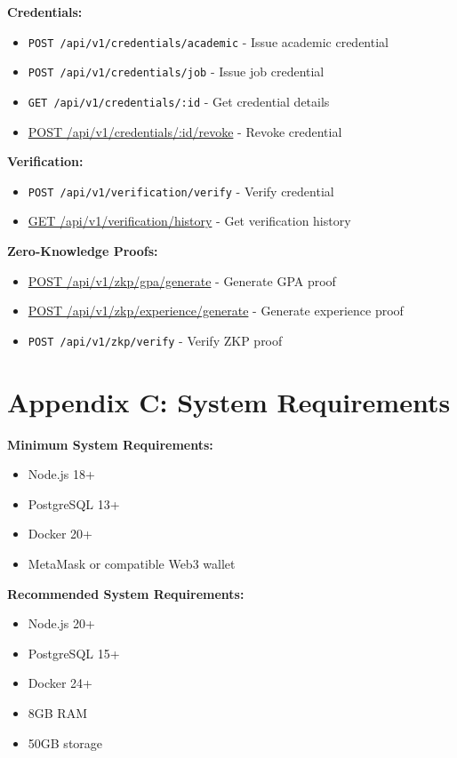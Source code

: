\documentclass[conference]{IEEEtran}
\begin{document}
\textbf{Credentials:}
\begin{itemize}
\item \texttt{POST /api/v1/credentials/academic} - Issue academic credential
\item \texttt{POST /api/v1/credentials/job} - Issue job credential
\item \texttt{GET /api/v1/credentials/:id} - Get credential details
\item \url{POST /api/v1/credentials/:id/revoke} - Revoke credential
\end{itemize}

\textbf{Verification:}
\begin{itemize}
\item \texttt{POST /api/v1/verification/verify} - Verify credential
\item \url{GET /api/v1/verification/history} - Get verification history
\end{itemize}

\textbf{Zero-Knowledge Proofs:}
\begin{itemize}
\item \url{POST /api/v1/zkp/gpa/generate} - Generate GPA proof
\item \url{POST /api/v1/zkp/experience/generate} - Generate experience proof
\item \texttt{POST /api/v1/zkp/verify} - Verify ZKP proof
\end{itemize}

\section*{Appendix C: System Requirements}

\textbf{Minimum System Requirements:}
\begin{itemize}
\item Node.js 18+
\item PostgreSQL 13+
\item Docker 20+
\item MetaMask or compatible Web3 wallet
\end{itemize}

\textbf{Recommended System Requirements:}
\begin{itemize}
\item Node.js 20+
\item PostgreSQL 15+
\item Docker 24+
\item 8GB RAM
\item 50GB storage
\end{itemize}
\end{document}

